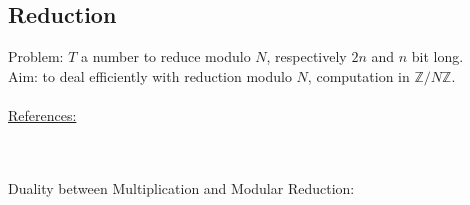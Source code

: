 \newpage
\subsection{Reduction}
\label{RSA_reduction}

Problem: $ T $ a number to reduce modulo $ N $, respectively $2n$ and $n$ bit long.\\
Aim: to deal efficiently with reduction modulo $N$, computation in $\mathbb{Z}/{N \mathbb{Z}}$.\\\\
\underline{References:}\\
\cite{crypto-1993-bosselaers}\\
\cite{arith-2007-hasenplaugh}\\
\cite{eprint-2014-zhengjun}

Duality between Multiplication and Modular Reduction: \cite{eprint-2005-fisher}

